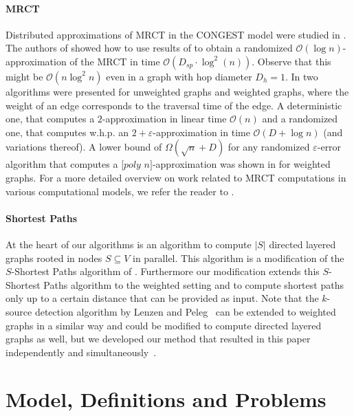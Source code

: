 \documentclass[11pt]{article}
\newcommand{\BO}{\mathcal{O}}
\begin{document}
\paragraph{MRCT}
Distributed approximations of MRCT in the CONGEST model were studied in \cite{hochuli:holzer:MRCST, khan2008efficient, sarma12}. The authors of \cite{khan2008efficient} showed how to use results of \cite{fakcharoenphol2003tight} to obtain a randomized $\BO(\log n)$-approximation of the MRCT in time $\BO\left(D_{sp}\cdot \log^2 \left(n\right)\right)$. Observe that this might be $\BO(n\log^2 n)$ even in a graph with hop diameter $D_h=1$. In \cite{hochuli:holzer:MRCST} two algorithms were presented for unweighted graphs and weighted graphs, where the weight of an edge corresponds to the traversal time of the edge. A deterministic one, that computes a $2$-approximation in linear time $\BO(n)$ and a randomized one, that computes w.h.p. an $2+\varepsilon$-approximation in time $\BO(D+\log n)$ (and variations thereof). A lower bound of $\Omega(\sqrt{n}+D)$ for any randomized $\varepsilon$-error algorithm that computes a $[poly$ $n]$-approximation was shown in \cite{sarma12} for weighted graphs. For a more detailed overview on work related to MRCT computations in various computational models, we refer the reader to \cite{hochuli:holzer:MRCST}.

\paragraph{Shortest Paths}
At the heart of our algorithms is an algorithm to compute $|S|$ directed layered graphs rooted in nodes $S\subseteq V$ in parallel. This algorithm is a modification of the $S$-Shortest Paths algorithm of \cite{holzer2012optimal}. Furthermore our modification extends this $S$-Shortest Paths algorithm to the weighted setting and to compute shortest paths only up to a certain distance that can be provided as input. Note that the $k$-source detection algorithm by Lenzen and Peleg~\cite{lenzen2013efficient} can be extended to weighted graphs in a similar way and could be modified to compute directed layered graphs as well, but we developed our method that resulted in this paper independently and simultaneously~\cite{dissler-thesis,holzer2013phd}.




\section{Model, Definitions and Problems}\label{sec:model}
\end{document}
